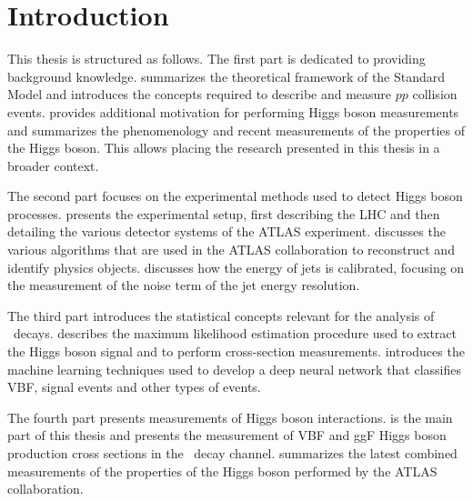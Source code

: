 \chapter{Introduction}
\label{chap:introduction}




\quad \newline

This thesis is structured as follows. 
The first part is dedicated to providing background knowledge.
 summarizes the theoretical framework of the Standard Model and introduces the concepts required to describe and measure $pp$ collision events.
 provides additional motivation for performing Higgs boson measurements and summarizes the phenomenology and recent measurements of the properties of the Higgs boson. This allows placing the research presented in this thesis in a broader context.

The second part focuses on the experimental methods used to detect Higgs boson processes. 
 presents the experimental setup, first describing the LHC and then detailing the various detector systems of the ATLAS experiment.
 discusses the various algorithms that are used in the ATLAS collaboration to reconstruct and identify physics objects.
 discusses how the energy of jets is calibrated, focusing on the measurement of the noise term of the jet energy resolution.

The third part introduces the statistical concepts relevant for the analysis of \HWW\ decays. 
 describes the maximum likelihood estimation procedure used to extract the Higgs boson signal and to perform cross-section measurements.
 introduces the machine learning techniques used to develop a deep neural network that classifies VBF, \HWW signal events and other types of events.

The fourth part presents measurements of Higgs boson interactions.
 is the main part of this thesis and presents the measurement of VBF and ggF Higgs boson production cross sections in the \HWW\ decay channel.
 summarizes the latest combined measurements of the properties of the Higgs boson performed by the ATLAS collaboration.


